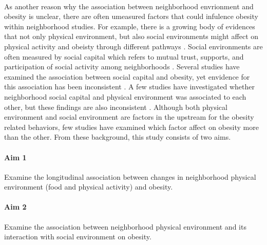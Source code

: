\documentclass[12]{article}
\begin{document}
\paragraph{}
As another reason why the association between neighborhood envrionment and obesity is unclear, there are often umeasured factors that could infulence obesity within neighborhood studies. For example, there is a growing body of evidences that not only physical environment, but also social environments might affect on physical activity and obeisty through different pathways \cite{carrillo2019neighbourhood,suglia2016neighborhood}. Social environments are often measured by social capital which refers to mutual trust, supports, and participation of social activity among neighborhoods \cite{kawachi1997social}. Several studies have examined the association between social capital and obesity, yet envidence for this association has been inconsistent \cite{carrillo2019neighbourhood}. A few studies have investigated whether neighborhood social capital and physical environment was associated to each other, but these findings are also inconsistent \cite{leyden2003social,hanibuchi2012does}. Although both physical environment and social environment are factors in the upstream for the obesity related behaviors, few studies have examined which factor affect on obesity more than the other. From these background, this study consists of two aims.

\paragraph{Aim 1}
Examine the longitudinal association between changes in neighborhood physical environment (food and physical activity) and obesity.
\paragraph{Aim 2}
Examine the association between neighborhood physical environment and its interaction with social environment on obesity.
\end{document}
